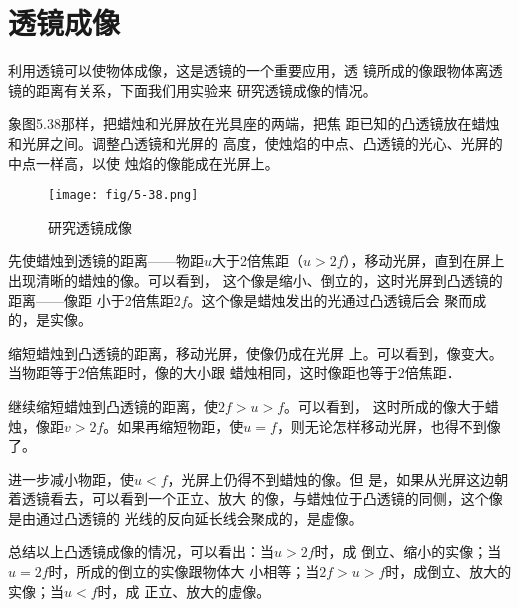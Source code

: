 \begin{figure}
\begin{tikzpicture}[>=latex]
    \end{tikzpicture}
\caption{}
\end{figure}

 \section{透镜成像}
    利用透镜可以使物体成像，这是透镜的一个重要应用，透
    镜所成的像跟物体离透镜的距离有关系，下面我们用实验来
    研究透镜成像的情况。

    象图5.38那样，把蜡烛和光屏放在光具座的两端，把焦
    距已知的凸透镜放在蜡烛和光屏之间。调整凸透镜和光屏的
    高度，使烛焰的中点、凸透镜的光心、光屏的中点一样高，以使
    烛焰的像能成在光屏上。
    \begin{figure}[htp]\centering
        \texttt{[image: fig/5-38.png]}
        \caption{研究透镜成像}
        \end{figure}

    先使蜡烛到透镜的距离——物距$u$大于2倍焦距（$u>
    2f$），移动光屏，直到在屏上出现清晰的蜡烛的像。可以看到，
    这个像是缩小、倒立的，这时光屏到凸透镜的距离——像距
    小于2倍焦距$2f$。这个像是蜡烛发出的光通过凸透镜后会
    聚而成的，是实像。

    缩短蜡烛到凸透镜的距离，移动光屏，使像仍成在光屏
    上。可以看到，像变大。当物距等于2倍焦距时，像的大小跟
    蜡烛相同，这时像距也等于2倍焦距．

    继续缩短蜡烛到凸透镜的距离，使$2f>u>f$。可以看到，
    这时所成的像大于蜡烛，像距$v>2f$。如果再缩短物距，使$u=
    f$，则无论怎样移动光屏，也得不到像了。

    进一步减小物距，使$u<f$，光屏上仍得不到蜡烛的像。但
    是，如果从光屏这边朝着透镜看去，可以看到一个正立、放大
    的像，与蜡烛位于凸透镜的同侧，这个像是由通过凸透镜的
    光线的反向延长线会聚成的，是虚像。

    总结以上凸透镜成像的情况，可以看出：当$u>2f$时，成
    倒立、缩小的实像；当$u=2f$时，所成的倒立的实像跟物体大
    小相等；当$2f>u>f$时，成倒立、放大的实像；当$u<f$时，成
    正立、放大的虚像。

